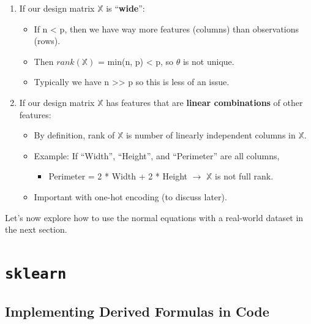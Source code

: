 \documentclass[
  letterpaper,
  DIV=11,
  numbers=noendperiod]{scrreprt}
\providecommand{\tightlist}{%
  \setlength{\itemsep}{0pt}\setlength{\parskip}{0pt}}\usepackage{longtable,booktabs,array}
\begin{document}
\begin{enumerate}
\def\labelenumi{\arabic{enumi}.}
\tightlist
\item
  If our design matrix \(\mathbb{X}\) is ``\textbf{wide}'':

  \begin{itemize}
  \tightlist
  \item
    If n \textless{} p, then we have way more features (columns) than
    observations (rows).
  \item
    Then \(rank(\mathbb{X})\) = min(n, p) \textless{} p, so
    \(\hat{\theta}\) is not unique.
  \item
    Typically we have n \textgreater\textgreater{} p so this is less of
    an issue.
  \end{itemize}
\item
  If our design matrix \(\mathbb{X}\) has features that are
  \textbf{linear combinations} of other features:

  \begin{itemize}
  \tightlist
  \item
    By definition, rank of \(\mathbb{X}\) is number of linearly
    independent columns in \(\mathbb{X}\).
  \item
    Example: If ``Width'', ``Height'', and ``Perimeter'' are all
    columns,

    \begin{itemize}
    \tightlist
    \item
      Perimeter = 2 * Width + 2 * Height \(\rightarrow\) \(\mathbb{X}\)
      is not full rank.
    \end{itemize}
  \item
    Important with one-hot encoding (to discuss later).
  \end{itemize}
\end{enumerate}

Let's now explore how to use the normal equations with a real-world
dataset in the next section.

\section{\texorpdfstring{\texttt{sklearn}}{sklearn}}\label{sklearn}

\subsection{Implementing Derived Formulas in
Code}\label{implementing-derived-formulas-in-code}
\end{document}
